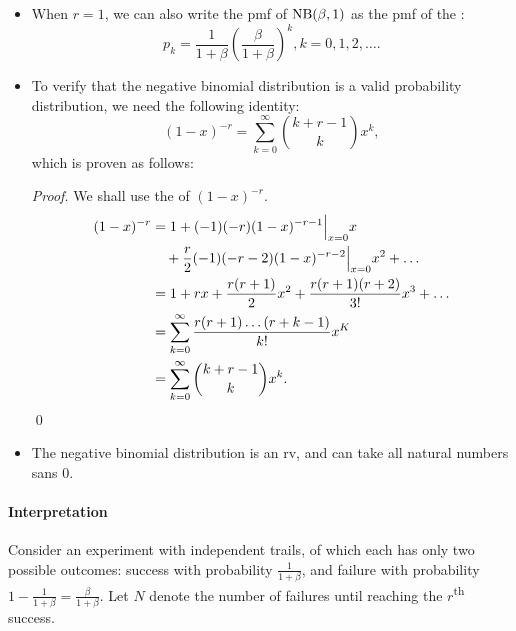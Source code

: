 \documentclass[notoc,notitlepage]{tufte-book}
\begin{document}
\begin{note}
  \begin{itemize}
    \item When $r = 1$, we can also write the pmf of $\operatorname{NB}(\beta, 1)$ as the pmf of the :
      \begin{equation*}
        p_k = \frac{1}{1 + \beta} \left( \frac{\beta}{1 + \beta} \right)^k, k = 0, 1, 2, \ldots.
      \end{equation*}

    \item To verify that the negative binomial distribution is a valid probability distribution, we need the following identity:
      \begin{equation*}
        (1 - x)^{-r} = \sum_{k=0}^{\infty} \binom{k + r - 1}{k} x^k,
      \end{equation*}
      which is proven as follows:

      \begin{proof}
        We shall use the  of $(1 - x)^{-r}$.
        \begin{align*}
          (1 - x)^{-r} &= 1 + (-1)(-r)(1 - x)^{-r-1}\Big|_{x = 0}^{} x \\
                       &\quad + \frac{r}{2} (-1) (-r-2) (1 - x)^{-r-2}\Big|_{x = 0}^{} x^2 + \hdots \\
                       &= 1 + rx + \frac{r(r + 1)}{2} x^2 + \frac{r(r + 1)(r + 2)}{3!} x^3 + \hdots \\
                       &= \sum_{k=0}^{\infty} \frac{r(r + 1) \hdots (r + k - 1)}{k!} x^K \\
                       &= \sum_{k=0}^{\infty} \binom{k + r - 1}{k} x^k.
        \end{align*}\qed\
      \end{proof}

    \item The negative binomial distribution is an  rv, and can take all natural numbers sans $0$.
  \end{itemize}
\end{note}

\paragraph{Interpretation} Consider an experiment with independent trails, of which each has only two possible outcomes: success with probability $\frac{1}{1 + \beta}$, and failure with probability $1 - \frac{1}{1 + \beta} = \frac{\beta}{1 + \beta}$. Let $N$ denote the number of failures until reaching the $r$\textsuperscript{th} success.
\end{document}
